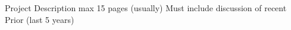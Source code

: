 \documentclass[11pt,letterpaper]{article}
\begin{document}
\setcounter{page}{1}
 Project Description max 15 pages (usually) Must include discussion of recent Prior (last 5 years) %
\setcounter{page}{1}
% 
\setcounter{page}{1}

%
\setcounter{page}{1}
% 
\setcounter{page}{1}

\clearpage
\newpage
\setcounter{page}{1}
% 
\setcounter{page}{1}
% 

 \setcounter{page}{1}

 \setcounter{page}{1}

 \setcounter{page}{1}

\end{document}
